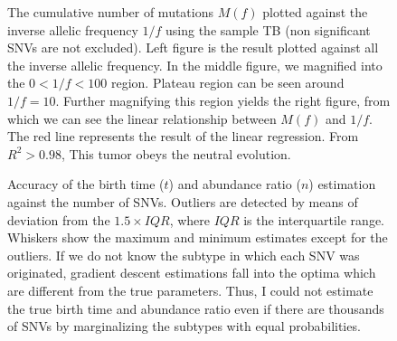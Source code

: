 \documentclass{article}
\begin{document}
\begin{figure}[H]
\begin{center}
 \caption{The cumulative number of mutations $M(f)$ plotted against the inverse allelic frequency $1/f$ using the sample TB (non significant SNVs are not excluded).
 Left figure is the result plotted against all the inverse allelic frequency. In the middle figure, we magnified into the $0 < 1/f < 100$ region. Plateau region can be seen around $1/f = 10$. Further magnifying this region yields the right figure, from which we can see the linear relationship between $M(f)$ and $1/f$. The red line represents the result of the linear regression. From $R^2 > 0.98$, This tumor obeys the neutral evolution.}
\end{center}
\end{figure}


\begin{figure}[H]
   \caption{
 Accuracy of the birth time ($t$) and abundance ratio ($n$) estimation against the number of SNVs. Outliers are detected by means of deviation from the $1.5 \times IQR$, where $IQR$ is the interquartile range. Whiskers show the maximum and minimum estimates except for the outliers. If we do not know the subtype in which each SNV was originated, gradient descent estimations fall into the optima which are different from the true parameters. Thus, I could not estimate the true birth time and abundance ratio even if there are thousands of SNVs by marginalizing the subtypes with equal probabilities.
  }
 \label{fig: binom_subtype_ungiven}
\end{figure}
\end{document}
